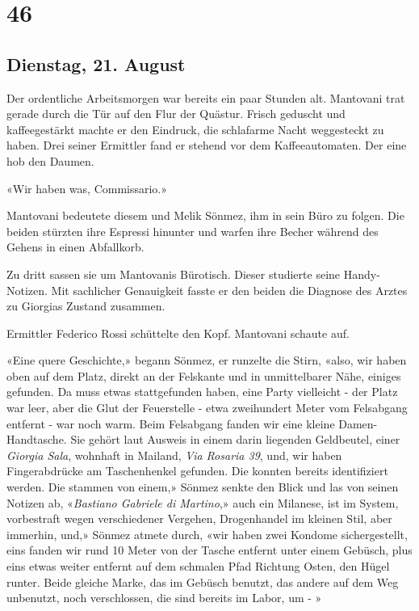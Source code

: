\chapter{46}

\section{Dienstag, 21. August}



Der ordentliche Arbeitsmorgen war bereits ein paar Stunden alt.
Mantovani trat gerade durch die Tür auf den Flur der Quästur. Frisch
geduscht und kaffeegestärkt machte er den Eindruck, die schlafarme Nacht
weggesteckt zu haben. Drei seiner Ermittler fand er stehend vor dem
Kaffeeautomaten. Der eine hob den Daumen.

«Wir haben was, Commissario.»

Mantovani bedeutete diesem und Melik Sönmez, ihm in sein Büro zu folgen.
Die beiden stürzten ihre Espressi hinunter und warfen ihre Becher
während des Gehens in einen Abfallkorb.

Zu dritt sassen sie um Mantovanis Bürotisch. Dieser studierte seine
Handy-Notizen. Mit sachlicher Genauigkeit fasste er den beiden die
Diagnose des Arztes zu Giorgias Zustand zusammen.

Ermittler Federico Rossi schüttelte den Kopf.
Mantovani schaute auf.

«Eine quere Geschichte,» begann Sönmez, er runzelte die Stirn, «also,
wir haben oben auf dem Platz, direkt an der Felskante und in
unmittelbarer Nähe, einiges gefunden. Da muss etwas stattgefunden haben,
eine Party vielleicht - der Platz war leer, aber die Glut der
Feuerstelle  - etwa zweihundert Meter vom Felsabgang entfernt - war noch warm. Beim Felsabgang fanden wir eine kleine Damen-Handtasche.
Sie gehört laut Ausweis in einem darin liegenden Geldbeutel, einer
\emph{Giorgia Sala}, wohnhaft in Mailand, \emph{Via Rosaria 39}, und,
wir haben Fingerabdrücke am Taschenhenkel gefunden. Die konnten bereits
identifiziert werden. Die stammen von einem,» Sönmez senkte den Blick
und las von seinen Notizen ab, «\emph{Bastiano Gabriele di Martino},»
auch ein Milanese, ist im System, vorbestraft wegen verschiedener
Vergehen, Drogenhandel im kleinen Stil, aber immerhin, und,» Sönmez atmete durch, «wir haben zwei Kondome sichergestellt, eins fanden wir rund 10 Meter von der Tasche entfernt unter einem Gebüsch, plus eins
etwas weiter entfernt auf dem schmalen Pfad Richtung Osten, den Hügel
runter. Beide gleiche Marke, das im Gebüsch benutzt, das andere 
auf dem Weg unbenutzt, noch verschlossen, die sind bereits im Labor, um - »

